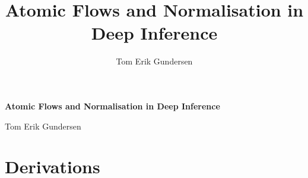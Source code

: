 \documentclass[11pt]{report}
\author{Tom Erik Gundersen}
\title{Atomic Flows and Normalisation in Deep Inference}
\begin{document}
%
%

\renewcommand{\thepage}{\roman{page}}
\maketitle

\clearpage
\thispagestyle{plain}
{\begin{center}
\vspace*{1.7cm}
{\def\baselinestretch{1.2}\Huge\bf Atomic Flows and Normalisation in Deep Inference \par}
\vspace{4cm}
{\begin{center}{\huge Tom Erik Gundersen }\end{center}}
\end{center}}


%



{
\tableofcontents 
}
\newpage
{}

\part{Derivations}


%
\end{document}
